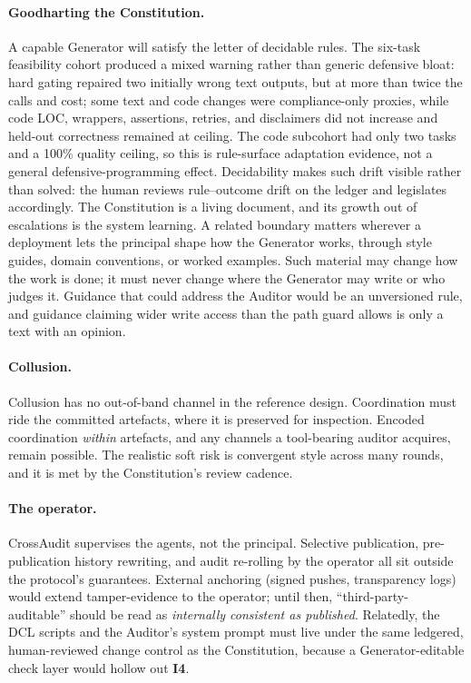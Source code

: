 \documentclass[11pt,letterpaper]{article}
\newcommand{\invariant}[1]{\textbf{I#1}}
\begin{document}
\paragraph{Goodharting the Constitution.} A capable Generator will satisfy the letter of decidable rules. The six-task feasibility cohort produced a mixed warning rather than generic defensive bloat: hard gating repaired two initially wrong text outputs, but at more than twice the calls and cost; some text and code changes were compliance-only proxies, while code LOC, wrappers, assertions, retries, and disclaimers did not increase and held-out correctness remained at ceiling. The code subcohort had only two tasks and a 100\% quality ceiling, so this is rule-surface adaptation evidence, not a general defensive-programming effect. Decidability makes such drift visible rather than solved: the human reviews rule--outcome drift on the ledger and legislates accordingly. The Constitution is a living document, and its growth out of escalations is the system learning. A related boundary matters wherever a deployment lets the principal shape how the Generator works, through style guides, domain conventions, or worked examples. Such material may change how the work is done; it must never change where the Generator may write or who judges it. Guidance that could address the Auditor would be an unversioned rule, and guidance claiming wider write access than the path guard allows is only a text with an opinion.

\paragraph{Collusion.} Collusion has no out-of-band channel in the reference design. Coordination must ride the committed artefacts, where it is preserved for inspection. Encoded coordination \emph{within} artefacts, and any channels a tool-bearing auditor acquires, remain possible. The realistic soft risk is convergent style across many rounds, and it is met by the Constitution's review cadence.

\paragraph{The operator.} CrossAudit supervises the agents, not the principal. Selective publication, pre-publication history rewriting, and audit re-rolling by the operator all sit outside the protocol's guarantees. External anchoring (signed pushes, transparency logs) would extend tamper-evidence to the operator; until then, ``third-party-auditable'' should be read as \emph{internally consistent as published}. Relatedly, the DCL scripts and the Auditor's system prompt must live under the same ledgered, human-reviewed change control as the Constitution, because a Generator-editable check layer would hollow out \invariant{4}.
\end{document}
